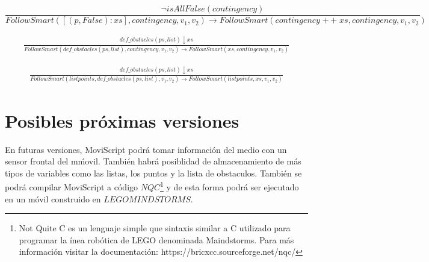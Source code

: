 \documentclass[11pt]{scrartcl}
\begin{document}
    \begin{equation}
        \frac{\neg isAllFalse(contingency)}{FollowSmart([(p,False):xs], contingency, v_1, v_2) \to
        FollowSmart(contingency \mathop{+\!\!+} xs, contingency, v_1, v_2) } 
        \end{equation}
    

\begin{equation}
\begin{split}
\frac{def\_obstacles(ps,list) \downarrow xs}{FollowSmart(def\_obstacles(ps,list), contingency, v_1, v_2) \to FollowSmart(xs, contingency, v_1, v_2)}
\end{split}
\end{equation}

\begin{equation}
    \begin{split}
    \frac{def\_obstacles(ps,list) \downarrow xs}{FollowSmart(listpoints, def\_obstacles(ps,list), v_1, v_2) \to FollowSmart(listpoints, xs, v_1, v_2)}
    \end{split}
    \end{equation}
    
\section{Posibles pr\'oximas versiones}

En futuras versiones, MoviScript podr\'a tomar informaci\'on del medio con un sensor frontal del m\'movil. 
Tambi\'en habr\'a posiblidad de almacenamiento de m\'as tipos de variables como las listas, los puntos y la lista de obstaculos.
Tambi\'en se podr\'a compilar MoviScript a c\'odigo 
$NQC$\footnote{Not Quite C es un lenguaje simple que sintaxis similar a C utilizado para programar 
la \'inea rob\'otica de LEGO denominada Maindstorms. Para m\'as informaci\'on visitar la 
documentaci\'on: https://bricxcc.sourceforge.net/nqc/}
 y de esta forma podr\'a ser ejecutado en un m\'ovil construido 
 en $LEGO MINDSTORMS$.
\end{document}
